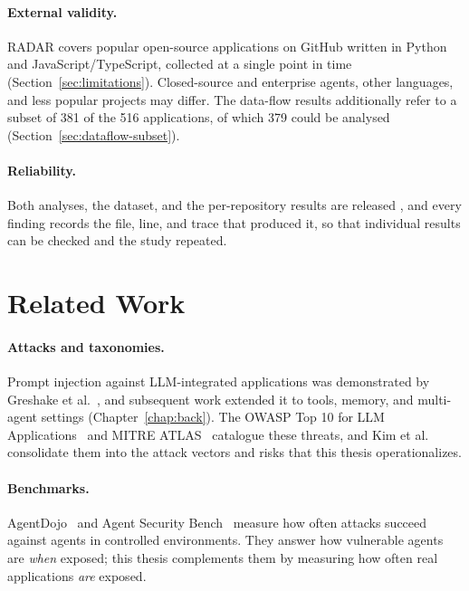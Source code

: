 \paragraph{External validity.} RADAR covers popular open-source applications on GitHub written in Python and JavaScript/TypeScript, collected at a single point in time (Section~\ref{sec:limitations}). Closed-source and enterprise agents, other languages, and less popular projects may differ. The data-flow results additionally refer to a subset of 381 of the 516 applications, of which 379 could be analysed (Section~\ref{sec:dataflow-subset}).

\paragraph{Reliability.} Both analyses, the dataset, and the per-repository results are released , and every finding records the file, line, and trace that produced it, so that individual results can be checked and the study repeated.

\section{Related Work}
\label{sec:related}

\paragraph{Attacks and taxonomies.} Prompt injection against LLM-integrated applications was demonstrated by Greshake et al.~\cite{greshake}, and subsequent work extended it to tools, memory, and multi-agent settings (Chapter~\ref{chap:back}). The OWASP Top 10 for LLM Applications~\cite{owasp} and MITRE ATLAS~\cite{mitre-atlas} catalogue these threats, and Kim et al.~\cite{kim2026sok} consolidate them into the attack vectors and risks that this thesis operationalizes.

\paragraph{Benchmarks.} AgentDojo~\cite{agentdojo} and Agent Security Bench~\cite{asb} measure how often attacks succeed against agents in controlled environments. They answer how vulnerable agents are \emph{when} exposed; this thesis complements them by measuring how often real applications \emph{are} exposed.

